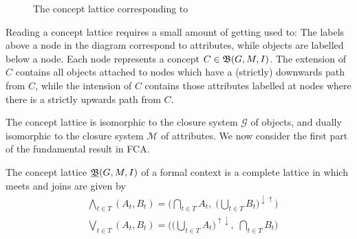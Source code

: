 \begin{figure}[H]
	\vspace{-6em}
	\caption{The concept lattice corresponding to }
	\label{figure:concept-lattice-group-likes}
\end{figure}

\begin{remark}
	Reading a concept lattice requires a small amount of getting used to: The labels above a node in the diagram
	correspond to attributes, while objects are labelled below a node. Each node represents a concept $C \in {\mathfrak B} (G,M,\mathrel{I})$. The extension
	of $C$ contains all objects attached to nodes which have a (strictly) downwards path from $C$, while the intension of
	$C$ contains those attributes labelled at nodes where there is a strictly upwards path from $C$.
\end{remark}

The concept lattice is isomorphic to the closure system $\mathcal{G}$ of objects, and dually isomorphic to the closure
system $\mathcal{M}$ of attributes. We now consider the first part of the fundamental result in FCA.

\begin{theorem}
	\label{theorem:basic-theorem-part1} The concept lattice $\underline{{\mathfrak B}} (G,M,\mathrel{I})$ of a formal context is a complete lattice in which meets
	and joins are given by
	\begin{align*}
		 & \underset{t \in T}\bigwedge (A_{t}, B_{t}) = \Big( \underset{t \in T}\bigcap A_{t}, \; \big(\underset{t \in T}\bigcup B_{t}\big)^{\downarrow \uparrow}\Big) \\
		 & \underset{t \in T}\bigvee (A_{t}, B_{t}) = \Big( \big(\underset{t \in T}\bigcup A_{t}\big)^{\uparrow \downarrow},\; \underset{t \in T}\bigcap B_{t}\Big)
	\end{align*}
\end{theorem}

